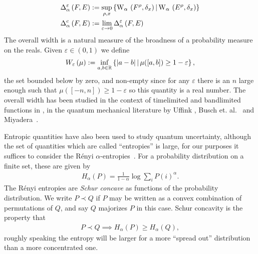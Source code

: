 \begin{align}
  \calibError{F}{E}{\alpha}[\varepsilon] &\defeq \sup_{\rho,x} \sbuild{\ws{F^\rho,\delta_{x}}[\alpha]}{\ws{E^\rho,\delta_{x}}[\alpha]}\\
  \calibError{F}{E}{\alpha} &\defeq \lim_{\varepsilon\to 0} \calibError{F}{E}{\alpha}[\varepsilon]  
\end{align}
The overall width is a natural measure of the broadness of a probability measure on the reals. Given $\varepsilon\in (0,1)$ we define
\begin{align}
  W_{\varepsilon}\left({\mu}\right) := \inf_{a,b\in\mathbb{R}} \left\{{\left\lvert{a-b}\right\rvert}\,\middle|\,\mu([a,b])\geq 1-\varepsilon\right\}, \label{eqn:overall-width-defn}
\end{align}
the set bounded below by zero, and non-empty since for any $\varepsilon$ there is an $n$ large enough such that $\mu([-n,n])\geq 1-\varepsilon$ so this quantity is a real number. The overall width has been studied in the context of timelimited and bandlimited functions in \cite{6773660}, in the quantum mechanical literature by Uffink \cite{ufink-thesis}, Busch et. al.~\cite{BUSCH2007155} and Miyadera~\cite{doi:10.1063/1.3614503}.

Entropic quantities have also been used to study quantum uncertainty, although the set of quantities which are called ``entropies'' is large, for our purposes it suffices to consider the R\'enyi $\alpha$-entropies~\cite{renyi1961}. For a probability distribution on a finite set, these are given by
\begin{align}
  H_\alpha(P) = \frac{1}{1-\alpha} \log{\sum_i P(i)^\alpha}.
\end{align}
The R{\'e}nyi entropies are \emph{Schur concave} as functions of the probability distribution. We write $P \prec Q$ if $P$ may be written as a convex combination of permutations of $Q$, and say $Q$ majorizes $P$ in this case. Schur concavity is the property that
\begin{align}
  P\prec Q \implies H_\alpha(P) \geq H_\alpha(Q),
\end{align}
roughly speaking the entropy will be larger for a more ``spread out'' distribution than a more concentrated one.

